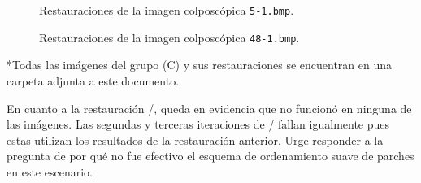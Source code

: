 \begin{figure}[H]
	\centering
	\caption{Restauraciones de la imagen colposc\'opica \texttt{5-1.bmp}.}
	\label{fig:5-1.bmp}
\end{figure}

\begin{figure}[H]
	\centering
	\caption{Restauraciones de la imagen colposc\'opica \texttt{48-1.bmp}.}
	\label{fig:48-1.bmp}
\end{figure}

\begin{scriptsize}
	*Todas las im\'agenes del grupo (C) y sus restauraciones se encuentran en una carpeta adjunta a este documento.
\end{scriptsize}

En cuanto a la restauraci\'on \SOP/, queda en evidencia que no funcion\'o en ninguna de las im\'agenes. Las segundas y terceras iteraciones de \SOP/ fallan igualmente pues estas utilizan los resultados de la restauraci\'on anterior. Urge responder a la pregunta de por qu\'e no fue efectivo el esquema de ordenamiento suave de parches en este escenario.

